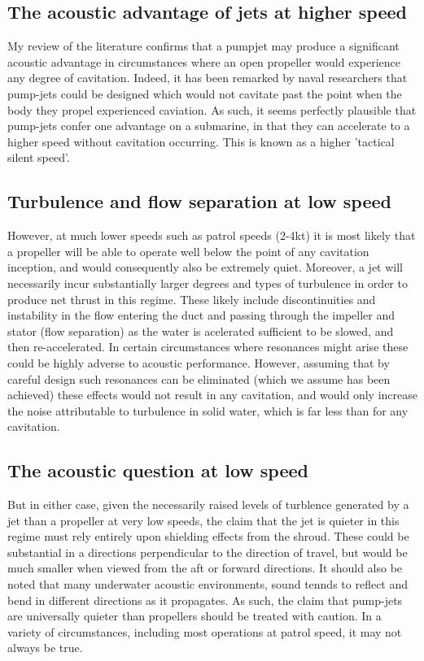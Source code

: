 \documentclass{article}\usepackage[]{graphicx}\usepackage[]{color}
\begin{document}
\subsection{The acoustic advantage of jets at higher speed}
My review of the literature confirms that a pumpjet may produce a significant acoustic advantage in circumstances where an open propeller would experience any degree of cavitation. Indeed, it has been remarked by naval researchers that pump-jets could be designed which would not cavitate past the point when the body they propel experienced caviation.   As such, it seems perfectly plausible that pump-jets confer one advantage on a submarine, in that they can accelerate to a higher speed without cavitation occurring.  This is known as a higher 'tactical silent speed'.

\subsection{Turbulence and flow separation at low speed}
However, at much lower speeds such as patrol speeds (2-4kt) it is most likely that a propeller will be able to operate well below the point of any cavitation inception, and would consequently also be extremely quiet.  Moreover, a jet will necessarily incur substantially larger degrees and types of turbulence in order to produce net thrust in this regime.  These likely include discontinuities and instability in the flow entering the duct and passing through the impeller and stator (flow separation) as the water is acelerated sufficient to be slowed, and then re-accelerated.  In certain circumstances where resonances might arise these could be highly adverse to acoustic performance.  However, assuming that by careful design such resonances can be eliminated (which we assume has been achieved) these effects would not result in any cavitation, and would only increase the noise attributable to turbulence in solid water, which is far less than for any cavitation.

\subsection{The acoustic question at low speed}
But in either case, given the necessarily raised levels of turblence generated by a jet than a propeller at very low speeds, the claim that the jet is quieter in this regime must rely entirely upon shielding effects from the shroud.  These could be substantial in a directions perpendicular to the direction of travel, but would be much smaller when viewed from the aft or forward directions.  It should also be noted that many underwater acoustic environments, sound tennds to reflect and bend in different directions as it propagates. As such, the claim that pump-jets are universally quieter than propellers should be treated with caution.  In a variety of circumstances, including most operations at patrol speed, it may not always be true.
\end{document}
